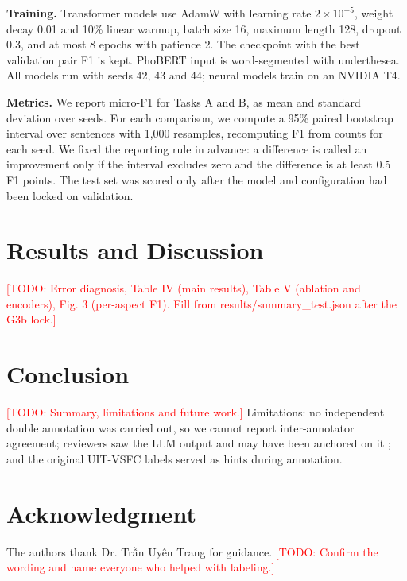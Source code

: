 \documentclass[9pt, conference, a4paper, compsocconf]{IEEEtran}
\newif\ifanon
\newcommand{\TODO}[1]{\textcolor{red}{[TODO: #1]}}
\begin{document}
\textbf{Training.} Transformer models use AdamW with learning rate $2\times10^{-5}$, weight decay 0.01 and 10\% linear warmup, batch size 16, maximum length 128, dropout 0.3, and at most 8 epochs with patience 2. The checkpoint with the best validation pair F1 is kept. PhoBERT input is word-segmented with underthesea. All models run with seeds 42, 43 and 44; neural models train on an NVIDIA T4.

\textbf{Metrics.} We report micro-F1 for Tasks A and B, as mean and standard deviation over seeds. For each comparison, we compute a 95\% paired bootstrap interval over sentences with 1,000 resamples, recomputing F1 from counts for each seed. We fixed the reporting rule in advance: a difference is called an improvement only if the interval excludes zero and the difference is at least 0.5 F1 points. The test set was scored only after the model and configuration had been locked on validation.

\section{Results and Discussion}
\TODO{Error diagnosis, Table IV (main results), Table V (ablation and encoders), Fig. 3 (per-aspect F1). Fill from results/summary\_test.json after the G3b lock.}

\section{Conclusion}
\TODO{Summary, limitations and future work.} Limitations: no independent double annotation was carried out, so we cannot report inter-annotator agreement; reviewers saw the LLM output and may have been anchored on it \cite{schroeder2025human}; and the original UIT-VSFC labels served as hints during annotation.

\ifanon\else
\section*{Acknowledgment}
The authors thank Dr. Trần Uyên Trang for guidance. \TODO{Confirm the wording and name everyone who helped with labeling.}
\fi

\balance


\end{document}
